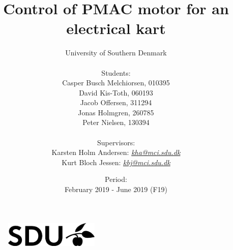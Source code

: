 \documentclass[12pt,a4paper]{article}
\title{Control of PMAC motor for an electrical kart}
\author{University of Southern Denmark
 \\ \\ Students: \\ Casper Busch Melchiorsen, 010395 \\ David Kis-Toth, 060193\\ Jacob Offersen, 311294 \\ Jonas Holmgren, 260785 \\ Peter Nielsen, 130394 \\ \\
Supervisors: \\ 
Karsten Holm Andersen: \href{mailto:kha@mci.sdu.dk}{\textit{kha@mci.sdu.dk}} \\
Kurt Bloch Jessen: \href{mailto:kbj@mci.sdu.dk}{\textit{kbj@mci.sdu.dk}}}
\date{Period: \\ 
 February 2019 - June 2019 (F19)}
\begin{document}
\begin{titlepage}
\thispagestyle{empty}
    \begin{figure}
        \vspace{-30pt}
        \centering
        \includegraphics[width=0.4\textwidth]{pictures/general/SDU.png}
        \vspace{-50pt}
    \end{figure}
    \vspace{-1cm}
\end{titlepage}



\maketitle
\thispagestyle{empty}


% 

\newpage






\newpage


\newpage
\tableofcontents
\newpage


\newpage



\newpage


\newpage




\newpage


\newpage


\newpage


\newpage

\newpage


\newpage


\newpage
\listoffigures

\newpage


\newpage

\end{document}
